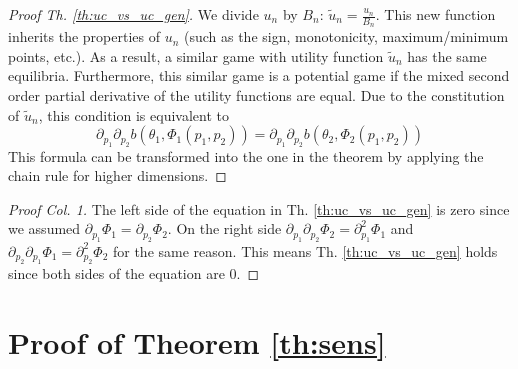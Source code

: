 \documentclass[USenglish,oneside,twocolumn]{article}
\theoremstyle{plain}
\begin{document}
\begin{appendices}
        \begin{proof}[Proof Th. \ref{th:uc_vs_uc_gen}]
            We divide $u_n$ by $B_n$: $\tilde{u}_n=\frac{u_n}{B_n}$. This new function inherits the properties of $u_n$ (such as the sign, monotonicity, maximum/minimum points, etc.). As a result, a similar game with utility function $\tilde{u}_n$ has the same equilibria. Furthermore, this similar game is a potential game if the mixed second order partial derivative of the utility functions are equal. Due to the constitution of $\tilde{u}_n$, this condition is equivalent to
            \begin{equation*}
            \partial_{p_1}\partial_{p_2}b(\theta_1,\Phi_1(p_1,p_2))=\partial_{p_1}\partial_{p_2}b(\theta_2,\Phi_2(p_1,p_2))
            \end{equation*}
            This formula can be transformed into the one in the theorem by applying the chain rule for higher dimensions.
        \end{proof}
        \begin{proof}[Proof Col. 1]
            The left side of the equation in Th. \ref{th:uc_vs_uc_gen} is zero since we assumed $\partial_{p_1}\Phi_1=\partial_{p_2}\Phi_2$. On the right side $\partial_{p_1}\partial_{p_2}\Phi_2=\partial^2_{p_1}\Phi_1$ and $\partial_{p_2}\partial_{p_1}\Phi_1=\partial^2_{p_2}\Phi_2$ for the same reason. This means Th. \ref{th:uc_vs_uc_gen} holds since both sides of the equation are 0.
        \end{proof}
        
        \section{Proof of Theorem \ref{th:sens}}
        \label{app:proof2}
        

\end{appendices}
\end{document}
